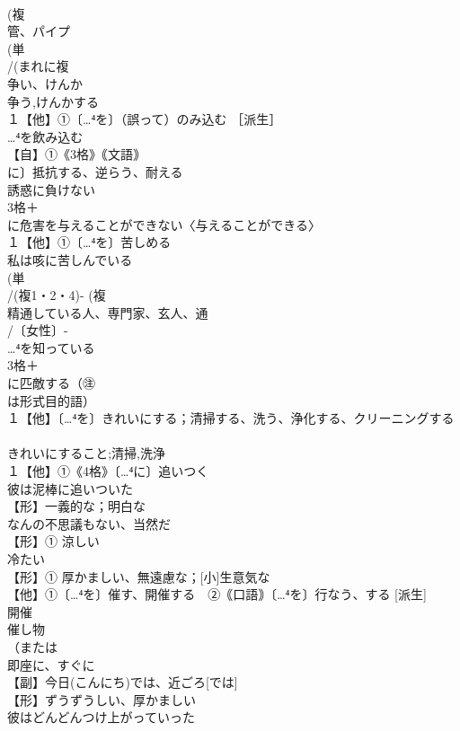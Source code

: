 \documentclass[8pt]{extreport}
\begin{document}
\begin{CJK}{UTF8}{min}
\\	(複
\\	管、パイプ
\\	(単
\\	/(まれに複
\\	争い、けんか 
\\	争う,けんかする
\\	１【他】①〔…⁴を〕（誤って）のみ込む ［派生］ 
\\	…⁴を飲み込む
\\	【自】①《3格》｟文語｠
\\	に〕抵抗する、逆らう、耐える 
\\	誘惑に負けない
\\	3格＋
\\	に危害を与えることができない〈与えることができる〉
\\	１【他】①〔…⁴を〕苦しめる 
\\	私は咳に苦しんでいる 
\\	(単
\\	/(複1・2・4)- (複
\\	精通している人、専門家、玄人、通 
\\	/〔女性〕-
\\	…⁴を知っている
\\	3格＋
\\	に匹敵する（㊟
\\	は形式目的語）
\\	１【他】〔…⁴を〕きれいにする；清掃する、洗う、浄化する、クリーニングする 
\\	[派生] 
\\	きれいにすること;清掃,洗浄
\\	１【他】①《4格》〔…⁴に〕追いつく 
\\	彼は泥棒に追いついた
\\	【形】一義的な；明白な
\\	なんの不思議もない、当然だ
\\	【形】① 涼しい 
\\	冷たい
\\	【形】① 厚かましい、無遠慮な；[小]生意気な
\\	【他】①〔…⁴を〕催す、開催する　②｟口語｠〔…⁴を〕行なう、する [派生] 
\\	開催　
\\	催し物
\\	（または
\\	即座に、すぐに
\\	【副】今日(こんにち)では、近ごろ[では] 
\\	【形】ずうずうしい、厚かましい 
\\	彼はどんどんつけ上がっていった 

\end{CJK}
\end{document}
